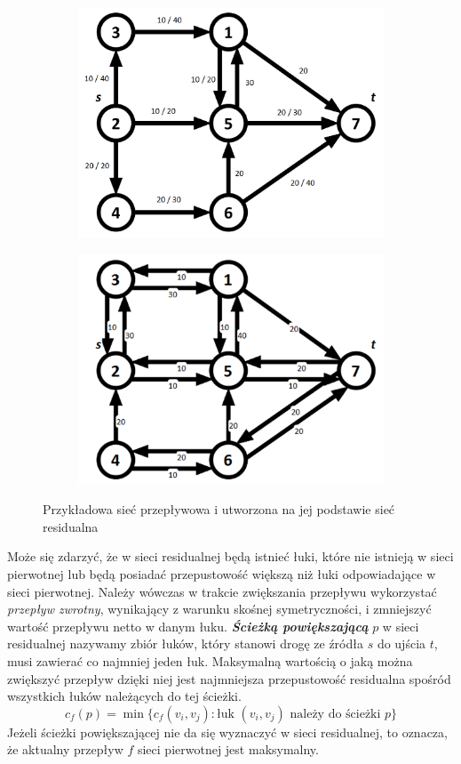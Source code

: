 \begin{figure}[H]
	\centering
	\begin{subfigure}{0.45\textwidth}
		\includegraphics[width=0.9\linewidth]{./img/residual1.png} 
		\caption{}
		\label{fig:residual1}
	\end{subfigure}
	\begin{subfigure}{0.45\textwidth}
		\includegraphics[width=0.9\linewidth]{./img/residual2.png}
		\caption{}
		\label{fig:residual2}
	\end{subfigure}
	\caption{Przykładowa sieć przepływowa i utworzona na jej podstawie sieć residualna}
	\label{fig:residual}
\end{figure}
Może się zdarzyć, że w sieci residualnej będą istnieć łuki, które nie istnieją w sieci pierwotnej lub będą posiadać przepustowość większą niż łuki odpowiadające w sieci pierwotnej. Należy wówczas w trakcie zwiększania przepływu wykorzystać \textit{przepływ zwrotny}, wynikający z warunku skośnej symetryczności, i zmniejszyć wartość przepływu netto w danym łuku.\newpage\indent
\textit{\textbf{Ścieżką powiększającą}} $ p $ w sieci residualnej nazywamy zbiór łuków, który stanowi drogę ze źródła $ s $ do ujścia $ t $, musi zawierać co najmniej jeden łuk. Maksymalną wartością o jaką można zwiększyć przepływ dzięki niej jest najmniejsza przepustowość residualna spośród wszystkich łuków należących do tej ścieżki.
$$ c_f(p)=\min\{ c_f(v_i,v_j):\text{łuk } (v_i,v_j) \text{ należy do ścieżki }p\} $$
Jeżeli ścieżki powiększającej nie da się wyznaczyć w sieci residualnej, to oznacza, że aktualny przepływ $ f $ sieci pierwotnej jest maksymalny.
